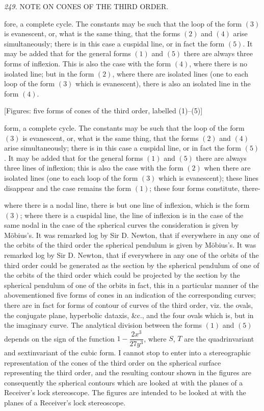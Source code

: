 \documentclass[11pt,a4paper]{book}
\begin{document}
\setcounter{page}{121}

\noindent\textit{249.} \quad NOTE ON CONES OF THE THIRD ORDER.

fore, a complete cycle. The constants may be such that the loop of the form $(3)$ is evanescent, or, what is the same thing, that the forms $(2)$ and $(4)$ arise simultaneously; there is in this case a cuspidal line, or in fact the form $(5)$. It may be added that for the general forms $(1)$ and $(5)$ there are always three forms of inflexion. This is also the case with the form $(4)$, where there is no isolated line; but in the form $(2)$, where there are isolated lines (one to each loop of the form $(3)$ which is evanescent), there is also an isolated line in the form $(4)$.

\begin{center}
[Figures: five forms of cones of the third order, labelled (1)--(5)]
\end{center}

\noindent
form, a complete cycle. The constants may be such that the loop of the form $(3)$ is evanescent, or, what is the same thing, that the forms $(2)$ and $(4)$ arise simultaneously; there is in this case a cuspidal line, or in fact the form $(5)$. It may be added that for the general forms $(1)$ and $(5)$ there are always three lines of inflexion; this is also the case with the form $(2)$ when there are isolated lines (one to each loop of the form $(3)$ which is evanescent); these lines disappear and the case remains the form $(1)$; these four forms constitute, there-

\setcounter{page}{122}

\noindent
where there is a nodal line, there is but one line of inflexion, which is the form $(3)$; where there is a cuspidal line, the line of inflexion is in the case of the same nodal in the case of the spherical curves the consideration is given by Möbius's. It was remarked log by Sir D. Newton, that if everywhere in any one of the orbits of the third order the spherical pendulum is given by Möbius's. It was remarked log by Sir D. Newton, that if everywhere in any one of the orbits of the third order could be generated as the section by the spherical pendulum of one of the orbits of the third order which could be projected by the section by the spherical pendulum of one of the orbits in fact, this in a particular manner of the abovementioned five forms of cones in an indication of the corresponding curves; there are in fact for forms of contour of curves of the third order, viz. the ovals, the conjugate plane, hyperbolic dataxis, &c., and the four ovals which is, but in the imaginary curve. The analytical division between the forms $(1)$ and $(5)$ depends on the sign of the function $1 - \dfrac{2x^3}{27y^3}$, where $S$, $T$ are the quadrinvariant and sextinvariant of the cubic form. I cannot stop to enter into a stereographic representation of the cones of the third order on the spherical surface representing the third order, and the resulting contour shown in the figures are consequently the spherical contours which are looked at with the planes of a Receiver's lock stereoscope. The figures are intended to be looked at with the planes of a Receiver's lock stereoscope.
\end{document}
